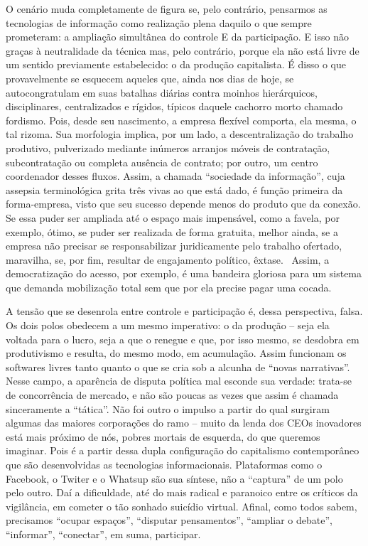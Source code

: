 O cenário muda completamente de figura se, pelo contrário, pensarmos as
tecnologias de informação como realização plena daquilo o que sempre
prometeram: a ampliação simultânea do controle E da participação. E isso
não graças à neutralidade da técnica mas, pelo contrário, porque ela não
está livre de um sentido previamente estabelecido: o da produção
capitalista. É disso o que provavelmente se esquecem aqueles que, ainda
nos dias de hoje, se autocongratulam em suas batalhas diárias contra
moinhos hierárquicos, disciplinares, centralizados e rígidos, típicos
daquele cachorro morto chamado fordismo. Pois, desde seu nascimento, a
empresa flexível comporta, ela mesma, o tal rizoma. Sua morfologia
implica, por um lado, a descentralização do trabalho produtivo,
pulverizado mediante inúmeros arranjos móveis de contratação,
subcontratação ou completa ausência de contrato; por outro, um centro
coordenador desses fluxos. Assim, a chamada ``sociedade da informação'',
cuja assepsia terminológica grita três vivas ao que está dado, é função
primeira da forma-empresa, visto que seu sucesso depende menos do
produto que da conexão. Se essa puder ser ampliada até o espaço mais
impensável, como a favela, por exemplo, ótimo, se puder ser realizada de
forma gratuita, melhor ainda, se a empresa não precisar se
responsabilizar juridicamente pelo trabalho ofertado, maravilha, se, por
fim, resultar de engajamento político, êxtase. ~Assim, a democratização
do acesso, por exemplo, é uma bandeira gloriosa para um sistema que
demanda mobilização total sem que por ela precise pagar uma cocada.

A tensão que se desenrola entre controle e participação é, dessa
perspectiva, falsa. Os dois polos obedecem a um mesmo imperativo: o da
produção -- seja ela voltada para o lucro, seja a que o renegue e que,
por isso mesmo, se desdobra em produtivismo e resulta, do mesmo modo, em
acumulação. Assim funcionam os softwares livres tanto quanto o que se
cria sob a alcunha de ``novas narrativas''. Nesse campo, a aparência de
disputa política mal esconde sua verdade: trata-se de concorrência de
mercado, e não são poucas as vezes que assim é chamada sinceramente a
``tática''. Não foi outro o impulso a partir do qual surgiram algumas
das maiores corporações do ramo -- muito da lenda dos CEOs inovadores
está mais próximo de nós, pobres mortais de esquerda, do que queremos
imaginar. Pois é a partir dessa dupla configuração do capitalismo
contemporâneo que são desenvolvidas as tecnologias informacionais.
Plataformas como o Facebook, o Twiter e o Whatsup são sua síntese, não a
``captura'' de um polo pelo outro. Daí a dificuldade, até do mais
radical e paranoico entre os críticos da vigilância, em cometer o tão
sonhado suicídio virtual. Afinal, como todos sabem, precisamos ``ocupar
espaços'', ``disputar pensamentos'', ``ampliar o debate'', ``informar'',
``conectar'', em suma, participar.


